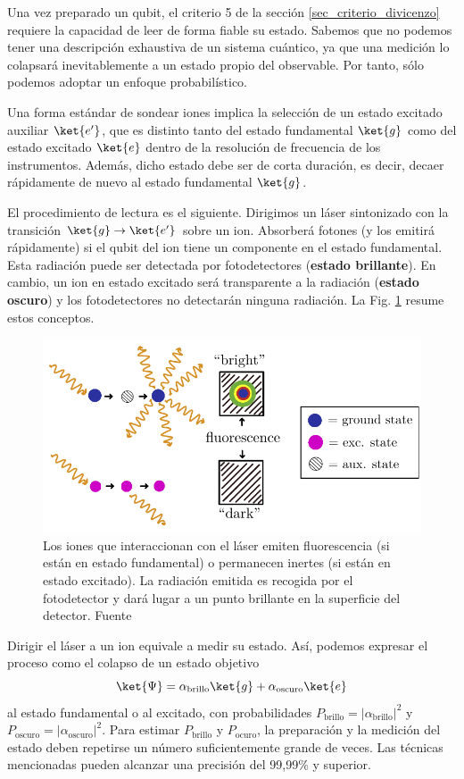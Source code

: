 Una vez preparado un qubit, el criterio 5 de la sección \ref{sec_criterio_divicenzo} requiere la capacidad de leer de forma fiable su estado. Sabemos que no podemos tener una descripción exhaustiva de un sistema cuántico, ya que una medición lo colapsará inevitablemente a un estado propio del observable. Por tanto, sólo podemos adoptar un enfoque probabilístico. 

Una forma estándar de sondear iones implica la selección de un estado excitado auxiliar $\ket{e'}$, que es distinto tanto del estado fundamental $\ket{g}$ como del estado excitado $\ket{e}$ dentro de la resolución de frecuencia de los instrumentos. Además, dicho estado debe ser de corta duración, es decir, decaer rápidamente de nuevo al estado fundamental $\ket{g}$.

El procedimiento de lectura es el siguiente. Dirigimos un láser sintonizado con la transición $\ket{g} \rightarrow \ket{e'}$ sobre un ion. Absorberá fotones (y los emitirá rápidamente) si el qubit del ion tiene un componente en el estado fundamental. Esta radiación puede ser detectada por fotodetectores (\textbf{estado brillante}). En cambio, un ion en estado excitado será transparente a la radiación (\textbf{estado oscuro}) y los fotodetectores no detectarán ninguna radiación. La Fig. \ref{Fig_ions_readout} resume estos conceptos. 

	\begin{figure}[h]
	\centering 
	\includegraphics[width=0.7\linewidth]{Figuras/Fig_ions_readout.png}
	\caption{Los iones que interaccionan con el láser emiten fluorescencia (si están en estado fundamental) o permanecen inertes (si están en estado excitado). La radiación emitida es recogida por el fotodetector y dará lugar a un punto brillante en la superficie del detector. Fuente \cite{bib_ions_main}}
	\label{Fig_ions_readout}
	\end{figure}

Dirigir el láser a un ion equivale a medir su estado. Así, podemos expresar el proceso como el colapso de un estado objetivo
	\begin{equation}
	\ket{\Psi} = \alpha_{\text{brillo}} \ket{g} + \alpha_{\text{oscuro}} \ket{e}
	\end{equation}
al estado fundamental o al excitado, con probabilidades $P_{\text{brillo}} = |\alpha_{\text{brillo}}|^2$ y $P_{\text{oscuro}} = |\alpha_{\text{oscuro}}|^2$. Para estimar $P_{\text{brillo}}$ y $P_{\text{ocuro}}$, la preparación y la medición del estado deben repetirse un número suficientemente grande de veces. Las técnicas mencionadas pueden alcanzar una precisión del 99,99\% y superior.


